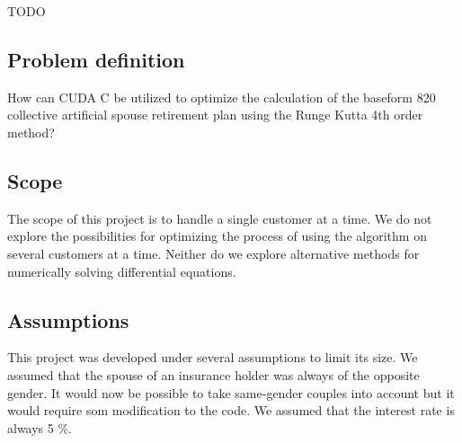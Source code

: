 
TODO

\subsection{Problem definition}
How can CUDA C be utilized to optimize the calculation of the baseform 820 collective artificial spouse retirement plan using the Runge Kutta 4th order method?

\subsection{Scope}
	The scope of this project is to handle a single customer at a time. We do not explore the possibilities for optimizing the process of using the algorithm on several customers at a time. Neither do we explore alternative methods for numerically solving differential equations.
	
\subsection{Assumptions}
This project was developed under several assumptions to limit its size. We assumed that the spouse of an insurance holder was always of the opposite gender. It would now be possible to take same-gender couples into account but it would require som modification to the code. We assumed that the  interest rate is always 5 \%. 


